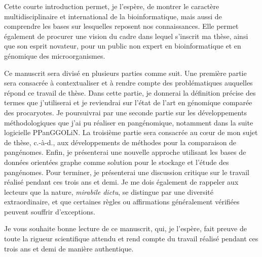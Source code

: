 Cette courte introduction permet, je l'espère, de montrer le caractère multidisciplinaire et international de la bioinformatique, mais aussi de comprendre les bases sur lesquelles reposent nos connaissances. Elle permet également de procurer une vision du cadre dans lequel s'inscrit ma thèse, ainsi que son esprit novateur, pour un public non expert en bioinformatique et en génomique des microorganismes.
\newline

Ce manuscrit sera divisé en plusieurs parties comme suit. Une première partie sera consacrée à contextualiser et à rendre compte des problématiques auquelles répond ce travail de thèse. Dans cette partie, je donnerai la définition précise des termes que j'utiliserai et je reviendrai sur l'état de l'art en génomique comparée des procaryotes. Je poursuivrai par une seconde partie sur les développements méthodologiques que j'ai pu réaliser en pangénomique, notamment dans la suite logicielle PPanGGOLiN. La troisième partie sera consacrée au c{\oe}ur de mon sujet de thèse, c.-à-d., aux développements de méthodes pour la comparaison de pangénomes. Enfin, je présenterai une nouvelle approche utilisant les bases de données orientées graphe comme solution pour le stockage et l'étude des pangénomes. Pour terminer, je présenterai une discussion critique sur le travail réalisé pendant ces trois ans et demi. Je me dois également de rappeler aux lecteurs que la nature, \textit{mirabile dictu}, se distingue par une diversité extraordinaire, et que certaines règles ou affirmations généralement vérifiées peuvent souffrir d'exceptions.
\newline

Je vous souhaite bonne lecture de ce manuscrit, qui, je l'espère, fait preuve de toute la rigueur scientifique attendu et rend compte du travail réalisé pendant ces trois ans et demi de manière authentique.
